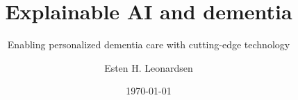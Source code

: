 \documentclass{beamer}
\title{Explainable AI and dementia}
\subtitle{Enabling personalized dementia care with cutting-edge technology}
\date{\today}
\author{Esten H. Leonardsen}
\begin{document}
    \begin{frame}
        \titlepage
    \end{frame}

    
    
    
    
    
\end{document}

